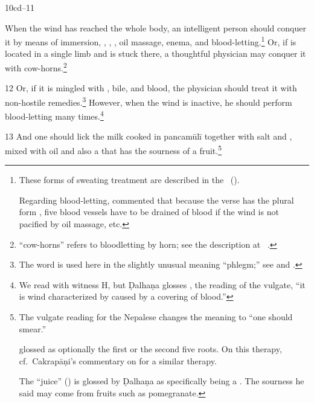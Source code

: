 \begin{translation}
    


    \item[10cd--11] 
    
When the wind has reached the whole body, an intelligent person should
conquer it by means of immersion, , , , oil massage, enema, and
blood-letting.\footnote{These forms of sweating treatment are
    described in the \CS\ ().
    
Regarding blood-letting,  commented  that because
the verse has the plural form , five blood vessels
have to be drained of blood if the wind is not pacified by oil
massage, etc.} Or, if is located in a single limb and is stuck there,
a thoughtful physician may conquer it with
cow-horns.\footnote{ “cow-horns” refers to bloodletting by
    horn; see the description at \SS\ .}
        
       
            
    \item[12] Or, if it is mingled with , bile, and
blood, the physician should treat it with non-hostile
remedies.\footnote{The word  is used here in the
    slightly unusual meaning “phlegm;” see  and \cite[553]{josi-maha}.} However, when the
    wind is inactive, he should perform blood-letting many
    times.\footnote{We read  with witness H, but
        Ḍalhaṇa glosses , the reading of the vulgate, “it is
        wind characterized by  caused by a covering
        of blood.”}

    \item[13] And one should lick the milk cooked in \gls{pancamūlī}
together with salt and ,
mixed with oil and also a  that has the sourness of
a fruit.\footnote{The vulgate reading  for the Nepalese 
 changes the meaning to “one should smear.”
    
     glossed  as optionally the first  or 
    the second five roots.  On this therapy, cf.\ Cakrapāṇi's commentary on 
     for a similar therapy.
    
    The “juice” () is glossed by Ḍalhaṇa as specifically being a 
    .   The sourness he said may come from fruits 
    such as pomegranate. 
    
}
\end{translation}
